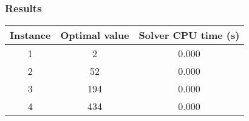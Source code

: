 \subsubsection*{Results}

\begin{table}[h!]
	\centering
	\begin{tabular}{|c|c|c|}
		\hline
		\textbf{Instance} & \textbf{Optimal value} & \textbf{Solver CPU time (s)} \\
		\hline
		1 & 2  & 0.000 \\
		\hline
		2 & 52 & 0.000 \\
		\hline
		3 & 194 & 0.000 \\
		\hline
		4 & 434 & 0.000 \\
		\hline
	\end{tabular}
	\label{tab:instance_costs}
\end{table}